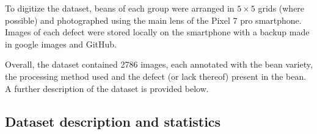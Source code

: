 To digitize the dataset, beans of each group were arranged in $5 \times 5$ grids
(where possible) and photographed using the main lens of the Pixel 7 pro smartphone.
Images of each defect were stored locally on the smartphone with a backup made
in google images and GitHub.

Overall, the dataset contained 2786 images, each annotated with the bean variety,
the processing method used and the defect (or lack thereof) present in the bean.
A further description of the dataset is provided below.

\subsection{Dataset description and statistics}
\label{subsec:dataset-description-and-statistics}

